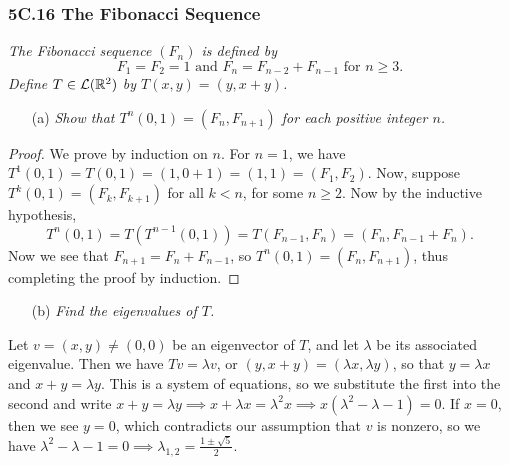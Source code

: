 \documentclass{article}
\begin{document}
\subsubsection*{5C.16 The Fibonacci Sequence}
\textit{The Fibonacci sequence $(F_n)$ is defined by}
$$F_1 = F_2 = 1 \textrm{ and } F_n = F_{n-2} + F_{n-1} \text{ for } n\geq 3.$$
\textit{Define $T\in\mathcal L(\mathbb R^2)$ by $T(x,y) = (y, x+y)$.}
\begin{itemize}
    \item[(a)] \textit{Show that $T^n(0, 1) = (F_n, F_{n+1})$ for each positive integer $n$.}
\end{itemize}
\begin{proof}
We prove by induction on $n$. For $n=1$, we have $T^1(0, 1) = T(0, 1) = (1, 0+1) = (1,1) = (F_1, F_2)$. Now, suppose $T^k(0, 1) = (F_k, F_{k+1})$ for all $k< n$, for some $n\geq 2$. Now by the inductive hypothesis,
$$T^n(0, 1) = T(T^{n-1}(0,1)) = T(F_{n-1}, F_n) = (F_n, F_{n-1} + F_n).$$
Now we see that $F_{n+1} = F_n + F_{n-1}$, so $T^n(0, 1) = (F_n, F_{n+1})$, thus completing the proof by induction.
\end{proof}
\begin{itemize}
    \item[(b)] \textit{Find the eigenvalues of $T$.}
\end{itemize}
\begin{solution}
Let $v = (x,y)\neq (0,0)$ be an eigenvector of $T$, and let $\lambda$ be its associated eigenvalue. Then we have $Tv = \lambda v$, or $(y, x+y) = (\lambda x, \lambda y)$, so that $y = \lambda x$ and $x+y = \lambda y$. This is a system of equations, so we substitute the first into the second and write $x + y = \lambda y\implies x + \lambda x = \lambda^2x\implies x(\lambda ^2 - \lambda - 1) = 0$. If $x = 0$, then we see $y=0$, which contradicts our assumption that $v$ is nonzero, so we have $\lambda^2-\lambda - 1 = 0\implies \boxed{\lambda_{1,2} = \frac{1 \pm \sqrt 5}{2}}.$
\end{solution}
\end{document}

